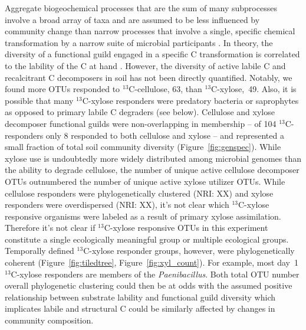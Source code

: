 Aggregate biogeochemical processes that are the sum of
many subprocesses involve a broad array of taxa and are assumed to be less
influenced by community change than narrow processes that involve a single,
specific chemical transformation by a narrow suite of microbial participants
\citep{Schimel_1995,McGuire2010}. In theory, the diversity of a functional
guild engaged in a specific C transformation is correlated to the lability of
the C at hand \citep{McGuire2010}. However, the diversity of active labile C and
recalcitrant C decomposers in soil has not been directly quantified. Notably,
we found more OTUs responded to $^{13}$C-cellulose, 63, than
$^{13}$C-xylose,~49. Also, it is possible that many $^{13}$C-xylose responders
were predatory bacteria or saprophytes as opposed to primary labile C degraders
(see below). Cellulose and xylose decomposer functional guilds were
non-overlapping in membership -- of 104 $^{13}$C-responders only 8 responded to
both cellulose and xylose -- and represented a small fraction of total soil
community diversity (Figure~\ref{fig:genspec}). While xylose use is undoubtedly
more widely distributed among microbial genomes than the ability to degrade
cellulose, the number of unique active cellulose decomposer OTUs outnumbered
the number of unique active xylose utilizer OTUs. While cellulose responders
were phylogenetically clustered (NRI: XX) and xylose responders were
overdispersed (NRI: XX), it's not clear which $^{13}$C-xylose responsive
organisms were labeled as a result of primary xylose assimilation. Therefore
it's not clear if $^{13}$C-xylose responsive OTUs in this experiment constitute
a single ecologically meaningful group or multiple ecological groups.
Temporally defined $^{13}$C-xylose responder groups, however, were
phylogenetically coherent (Figure~\ref{fig:tiledtree},
Figure~\ref{fig:xyl_count}). For example, most day~1 $^{13}$C-xylose responders
are members of the \textit{Paenibacillus}. Both total OTU number overall
phylogenetic clustering could then be at odds with the assumed positive
relationship between substrate lability and functional guild diversity which
implicates labile and structural C could be similarly affected by changes in
community composition. 

